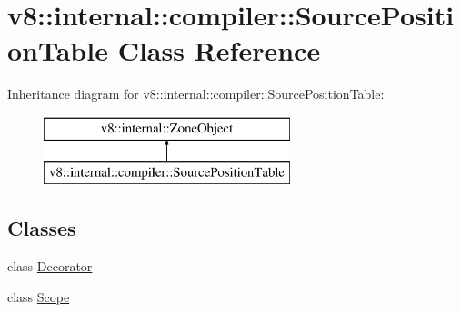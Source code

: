 \hypertarget{classv8_1_1internal_1_1compiler_1_1_source_position_table}{}\section{v8\+:\+:internal\+:\+:compiler\+:\+:Source\+Position\+Table Class Reference}
\label{classv8_1_1internal_1_1compiler_1_1_source_position_table}
Inheritance diagram for v8\+:\+:internal\+:\+:compiler\+:\+:Source\+Position\+Table\+:\begin{figure}[H]
\begin{center}
\leavevmode
\includegraphics[height=2.000000cm]{classv8_1_1internal_1_1compiler_1_1_source_position_table}
\end{center}
\end{figure}
\subsection*{Classes}
\begin{DoxyCompactItemize}
\item 
class \hyperlink{classv8_1_1internal_1_1compiler_1_1_source_position_table_1_1_decorator}{Decorator}
\item 
class \hyperlink{classv8_1_1internal_1_1compiler_1_1_source_position_table_1_1_scope}{Scope}
\end{DoxyCompactItemize}
